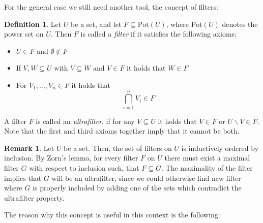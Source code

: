 \documentclass{article}
\theoremstyle{definition}
\newtheorem{rem}[Satz]{Remark}
\newtheorem{defn}[Satz]{Definition}
\begin{document}
For the general case we still need another tool, the concept of filters:

\begin{defn}
Let $U$ be a set, and let $F \subseteq \text{Pot}(U)$, where $\text{Pot}(U)$ denotes the power set on $U$. Then $F$ is called a \emph{filter} if it satisfies the following axioms: 
\begin{itemize}
\item  $U \in F$ and $\emptyset \notin F$
\item If $V,W \subseteq U$ with $V \subseteq W \text{ and }V  \in F $ it holds that $W \in F$
\item For $V_1, \ldots, V_n \in F$ it holds that \[ \bigcap_{i = 1}^n V_i \in F \]
\end{itemize}
A filter $F$ is called an \emph{ultrafilter}, if for any $V \subseteq U$ it holds that $V \in F$ or $U \backslash V \in F$. Note that the first and third axioms together imply that it cannot be both.
\end{defn}

\begin{rem}
Let $U$ be a set. Then, the set of filters on $U$ is inductively ordered by inclusion. By Zorn's lemma, for every filter $F$ on $U$ there must exist a maximal filter $G$ with respect to inclusion such, that $F \subseteq G$.
The maximality of the filter implies that $G$ will be an ultrafilter, since we could otherwise find new filter where $G$ is properly included by adding one of the sets which contradict the ultrafilter property.
\end{rem}

The reason why this concept is useful in this context is the following:
\end{document}
